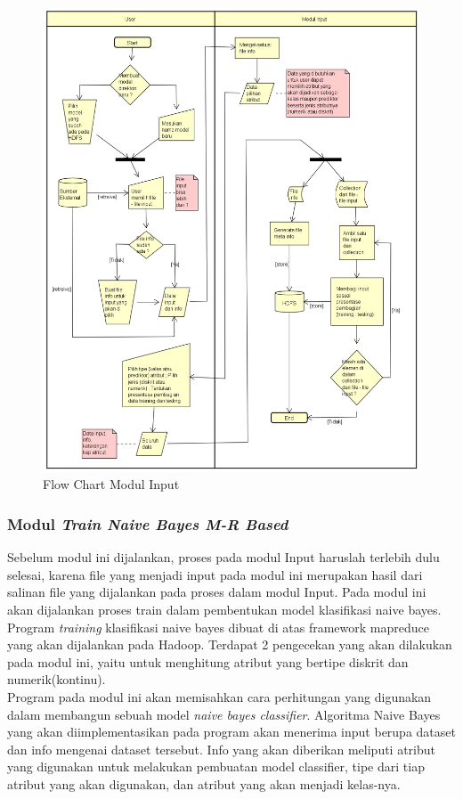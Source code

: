 \begin{figure}[H]
	\centering
	\label{fig:flow_input}
	\includegraphics[scale=0.55]{Diagram/Flowchart_Input}
	\caption[Flow Chart Modul Input]{Flow Chart Modul Input}
	\label{fig:Flow Chart Modul Input}
\end{figure}

\subsubsection{Modul \textit{Train Naive Bayes M-R Based}}

Sebelum modul ini dijalankan, proses pada modul Input haruslah terlebih dulu selesai, karena file yang menjadi input pada modul ini merupakan hasil dari salinan file yang dijalankan pada proses dalam modul Input. Pada modul ini akan dijalankan proses train dalam pembentukan model klasifikasi naive bayes. Program \textit{training} klasifikasi naive bayes dibuat di atas framework mapreduce yang akan dijalankan pada Hadoop. Terdapat 2 pengecekan yang akan dilakukan pada modul ini, yaitu untuk menghitung atribut yang bertipe diskrit dan numerik(kontinu).\\
	Program pada modul ini akan memisahkan cara perhitungan yang digunakan dalam membangun sebuah model \textit{naive bayes classifier}. Algoritma Naive Bayes yang akan diimplementasikan pada program akan menerima input berupa dataset dan info mengenai dataset tersebut. Info yang akan diberikan meliputi atribut yang digunakan untuk melakukan pembuatan model classifier, tipe dari tiap atribut yang akan digunakan, dan atribut yang akan menjadi kelas-nya.
	
